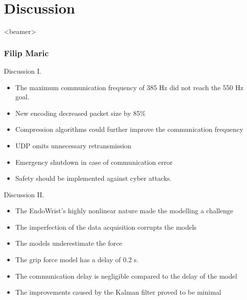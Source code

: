 \section{Discussion}
\begin{frame}<beamer>
\frametitle{Filip Maric}
\tableofcontents[currentsection]
\end{frame}


\begin{frame}{Discussion I.}{}


  \begin{itemize}
  	\item The maximum communication frequency of 385 Hz did not reach the 550 Hz goal.
  	\item New encoding  decreased packet size by 85\%
  	\item Compression algorithms could further improve the communication frequency
  	\item UDP omits unnecessary retransmission
  	\item Emergency shutdown in case of communication error
  	\item Safety should be implemented against cyber attacks.
  	
   
  \end{itemize}


\end{frame}

\begin{frame}{Discussion II.}{}
	
	
	\begin{itemize}
		\item The EndoWrist's highly nonlinear nature made the modelling a challenge
		\item The imperfection of the data acquisition corrupts the models
		\item The models underestimate the force
		\item The grip force model has a delay of 0.2 s.
		\item The communication delay is negligible compared to the delay of the model
		\item The improvements caused by the Kalman filter proved to be minimal
	\end{itemize}
	
	
\end{frame}




